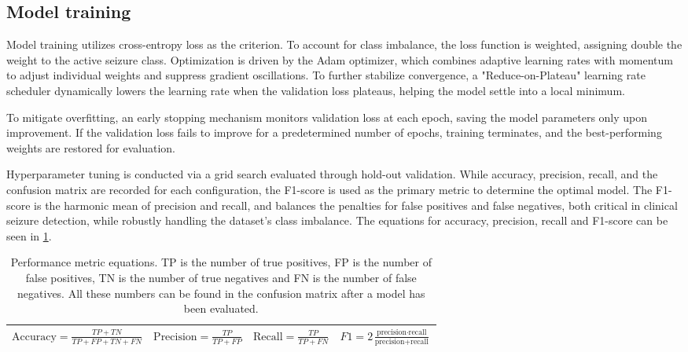 \subsection{Model training}
Model training utilizes cross-entropy loss as the criterion. To account for class imbalance, the loss function is weighted, assigning double the weight to the active seizure class. Optimization is driven by the Adam optimizer, which combines adaptive learning rates with momentum to adjust individual weights and suppress gradient oscillations. To further stabilize convergence, a "Reduce-on-Plateau" learning rate scheduler dynamically lowers the learning rate when the validation loss plateaus, helping the model settle into a local minimum.

To mitigate overfitting, an early stopping mechanism monitors validation loss at each epoch, saving the model parameters only upon improvement. If the validation loss fails to improve for a predetermined number of epochs, training terminates, and the best-performing weights are restored for evaluation.

Hyperparameter tuning is conducted via a grid search evaluated through hold-out validation. While accuracy, precision, recall, and the confusion matrix are recorded for each configuration, the F1-score is used as the primary metric to determine the optimal model. The F1-score is the harmonic mean of precision and recall, and balances the penalties for false positives and false negatives, both critical in clinical seizure detection, while robustly handling the dataset's class imbalance. The equations for accuracy, precision, recall and F1-score can be seen in \cref{tab:equations}.
\begin{table}[H]
    \centering
    \begin{tabular}{|c|c|c|c|}
        \hline
        $\text{Accuracy} = \frac{TP+TN}{TP+FP+TN+FN}$ & $\text{Precision} = \frac{TP}{TP+FP}$& $\text{Recall} = \frac{TP}{TP+FN}$ & $F1 = 2 \frac{\text{precision} \cdot \text{recall}}{\text{precision} + \text{recall}}$ \\
        \hline
    \end{tabular}
     \caption{Performance metric equations. TP is the number of true positives, FP is the number of false positives, TN is the number of true negatives and FN is the number of false negatives. All these numbers can be found in the confusion matrix after a model has been evaluated.}
    \label{tab:equations}
\end{table}


